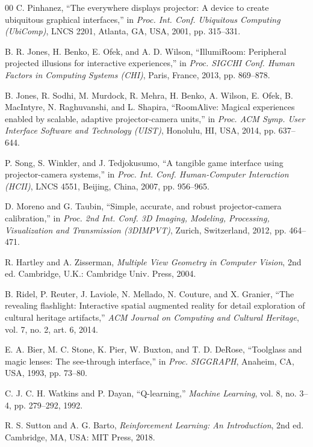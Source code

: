 \documentclass[conference]{IEEEtran}
\begin{document}
\begin{thebibliography}{00}
 C. Pinhanez, ``The everywhere displays projector: A device to create ubiquitous graphical interfaces,'' in \emph{Proc. Int. Conf. Ubiquitous Computing (UbiComp)}, LNCS 2201, Atlanta, GA, USA, 2001, pp. 315--331.

 B. R. Jones, H. Benko, E. Ofek, and A. D. Wilson, ``IllumiRoom: Peripheral projected illusions for interactive experiences,'' in \emph{Proc. SIGCHI Conf. Human Factors in Computing Systems (CHI)}, Paris, France, 2013, pp. 869--878.

 B. Jones, R. Sodhi, M. Murdock, R. Mehra, H. Benko, A. Wilson, E. Ofek, B. MacIntyre, N. Raghuvanshi, and L. Shapira, ``RoomAlive: Magical experiences enabled by scalable, adaptive projector-camera units,'' in \emph{Proc. ACM Symp. User Interface Software and Technology (UIST)}, Honolulu, HI, USA, 2014, pp. 637--644.

 P. Song, S. Winkler, and J. Tedjokusumo, ``A tangible game interface using projector-camera systems,'' in \emph{Proc. Int. Conf. Human-Computer Interaction (HCII)}, LNCS 4551, Beijing, China, 2007, pp. 956--965.

 D. Moreno and G. Taubin, ``Simple, accurate, and robust projector-camera calibration,'' in \emph{Proc. 2nd Int. Conf. 3D Imaging, Modeling, Processing, Visualization and Transmission (3DIMPVT)}, Zurich, Switzerland, 2012, pp. 464--471.

 R. Hartley and A. Zisserman, \emph{Multiple View Geometry in Computer Vision}, 2nd ed. Cambridge, U.K.: Cambridge Univ. Press, 2004.

 B. Ridel, P. Reuter, J. Laviole, N. Mellado, N. Couture, and X. Granier, ``The revealing flashlight: Interactive spatial augmented reality for detail exploration of cultural heritage artifacts,'' \emph{ACM Journal on Computing and Cultural Heritage}, vol. 7, no. 2, art. 6, 2014.

 E. A. Bier, M. C. Stone, K. Pier, W. Buxton, and T. D. DeRose, ``Toolglass and magic lenses: The see-through interface,'' in \emph{Proc. SIGGRAPH}, Anaheim, CA, USA, 1993, pp. 73--80.

 C. J. C. H. Watkins and P. Dayan, ``Q-learning,'' \emph{Machine Learning}, vol. 8, no. 3--4, pp. 279--292, 1992.

 R. S. Sutton and A. G. Barto, \emph{Reinforcement Learning: An Introduction}, 2nd ed. Cambridge, MA, USA: MIT Press, 2018.


\end{thebibliography}
\end{document}

